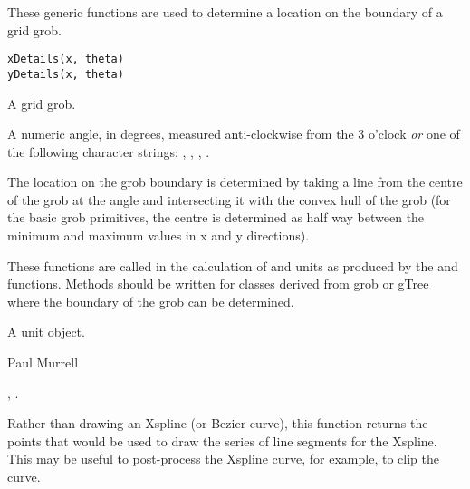 %
\begin{Description}\relax
These generic functions are used to determine a location
on the boundary of a grid grob.
\end{Description}
%
\begin{Usage}
\begin{verbatim}
xDetails(x, theta)
yDetails(x, theta)
\end{verbatim}
\end{Usage}
%
\begin{Arguments}
\begin{ldescription}
\item[\code{x}]  A grid grob. 
\item[\code{theta}]  A numeric angle, in degrees, measured
anti-clockwise from the 3 o'clock \emph{or} one of
the following character strings: ,
, , .
\end{ldescription}
\end{Arguments}
%
\begin{Details}\relax
The location on the grob boundary is determined by taking
a line from the centre of the grob at the angle 
and intersecting it with the convex hull of the grob
(for the basic
grob primitives, the centre is
determined as half way between the minimum and maximum values
in x and y directions).

These functions are called in the calculation of
 and  units as produced by
the  and  functions.
Methods should be written for classes derived from grob or gTree
where the boundary of the grob can be determined.
\end{Details}
%
\begin{Value}
A unit object.
\end{Value}
%
\begin{Author}\relax
 Paul Murrell 
\end{Author}
%
\begin{SeeAlso}\relax
{},
.
\end{SeeAlso}
%
\begin{Description}\relax
Rather than drawing an Xspline (or Bezier curve), this function returns
the points that would be used to draw the series of line
segments for the Xspline.  This may be useful to post-process
the Xspline curve, for example, to clip the curve.
\end{Description}
